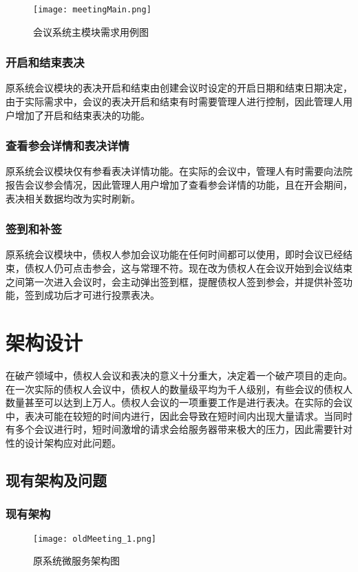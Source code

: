 \begin{figure}[!htp]
  \centering
  \texttt{[image: meetingMain.png]}
  \caption[主模块]
    {会议系统主模块需求用例图}
 \label{fig:meetingMain}
\end{figure}

\subsubsection{开启和结束表决}
原系统会议模块的表决开启和结束由创建会议时设定的开启日期和结束日期决定，由于实际需求中，会议的表决开启和结束有时需要管理人进行控制，因此管理人用户增加了开启和结束表决的功能。

\subsubsection{查看参会详情和表决详情}
原系统会议模块仅有参看表决详情功能。在实际的会议中，管理人有时需要向法院报告会议参会情况，因此管理人用户增加了查看参会详情的功能，且在开会期间，表决相关数据均改为实时刷新。

\subsubsection{签到和补签}
原系统会议模块中，债权人参加会议功能在任何时间都可以使用，即时会议已经结束，债权人仍可点击参会，这与常理不符。现在改为债权人在会议开始到会议结束之间第一次进入会议时，会主动弹出签到框，提醒债权人签到参会，并提供补签功能，签到成功后才可进行投票表决。

\section{架构设计}
在破产领域中，债权人会议和表决的意义十分重大，决定着一个破产项目的走向。在一次实际的债权人会议中，债权人的数量级平均为千人级别，有些会议的债权人数量甚至可以达到上万人。债权人会议的一项重要工作是进行表决。在实际的会议中，表决可能在较短的时间内进行，因此会导致在短时间内出现大量请求。当同时有多个会议进行时，短时间激增的请求会给服务器带来极大的压力，因此需要针对性的设计架构应对此问题。

\subsection{现有架构及问题}

\subsubsection{现有架构}
\begin{figure}[!htp]
  \centering
  \texttt{[image: oldMeeting\_1.png]}
  \caption[原微服务]
    {原系统微服务架构图\cite{Wang2021}}
 \label{fig:oldMeeting_1}
\end{figure}

